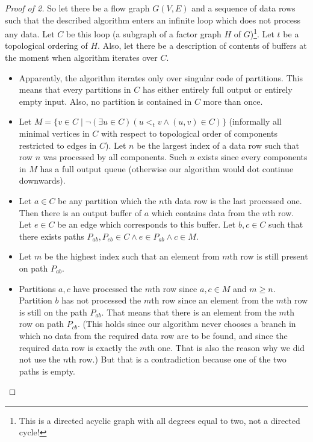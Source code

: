 \begin{proof}[Proof of 2] So let there be a flow graph $G(V,E)$ and a sequence of data rows such that the described algorithm enters an infinite loop which does not process any data. Let $C$ be this loop (a subgraph of a factor graph $H$ of $G$)\footnote{This is a directed acyclic graph with all degrees equal to two, not a directed cycle!}. Let $t$ be a topological ordering of $H$. Also, let there be a description of  contents of buffers at the moment when algorithm iterates over $C$.
  \begin{itemize}
    \item Apparently, the algorithm iterates only over singular code of partitions. This means that every partitions in $C$ has either entirely full output or entirely empty input. Also, no partition is contained in $C$ more than once.
    \item Let $M = \{v \in C \mid \neg (\exists u \in C)( u <_t v \land (u,v) \in C )\}$ (informally all minimal vertices in $C$ with respect to topological order of components restricted to edges in $C$). Let $n$ be the largest index of a data row such that row $n$ was processed by all components. Such $n$ exists since every components in $M$ has a full output queue (otherwise our algorithm would dot continue downwards).

    \item Let $a \in C$ be any partition which the $n$th data row is the last processed one. Then there is an output buffer of $a$ which contains data from the $n$th row. Let $e \in C$ be an edge which corresponds to this buffer.  Let $b,c \in C$ such that there exists paths $P_{ab}, P_{cb} \in C \land e \in P_{ab} \land c \in M$. 

    \item Let $m$ be the highest index such that an element from $m$th row is still present on path $P_{ab}$. 

    \item Partitions $a,c$ have processed the $m$th row since $a,c \in M$ and $m \geq n$. Partition $b$ has not processed the $m$th row since an element from the $m$th row is still on the path $P_{ab}$. That means that there is an element from the $m$th row on path $P_{cb}$. (This holds since our algorithm never chooses a branch in which no data from the required data row are to be found, and since the required data row is exactly the $m$th one. That is also the reason why we did not use the $n$th row.) But that is a contradiction because one of the two paths is empty.

  \end{itemize}

\end{proof}
